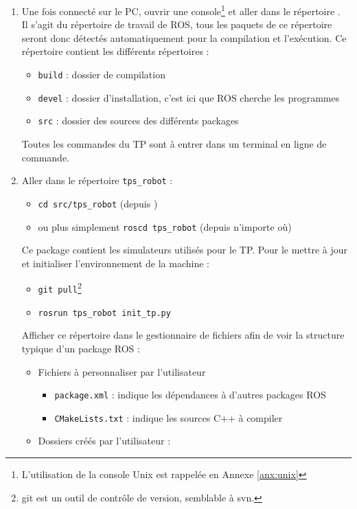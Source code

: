 \documentclass[12pt,a4paper]{article}
\begin{document}
\begin{enumerate}
 \item Une fois connecté sur le PC, ouvrir une console\footnote{ L'utilisation de la console Unix est rappelée en Annexe \ref{anx:unix}} et aller dans le répertoire \texttt{\ros}.\\
 Il s'agit du répertoire de travail de ROS, tous les paquets de ce répertoire seront donc détectés automatiquement pour la compilation et l'exécution.
 Ce répertoire contient les différents répertoires :
 \begin{itemize}
 \item \texttt{build} : dossier de compilation
 \item \texttt{devel} : dossier d'installation, c'est ici que ROS cherche les programmes
 \item \texttt{src} : dossier des sources des différents packages
 \end{itemize}
Toutes les commandes du TP sont à entrer dans un terminal en ligne de commande.
 \item Aller dans le répertoire \texttt{tps\_robot} : 
 \begin{itemize}
  \item \texttt{cd src/tps\_robot} (depuis \texttt{\ros})
  \item ou plus simplement \texttt{roscd tps\_robot} (depuis n'importe où)
 \end{itemize}
 Ce package contient les simulateurs utilisés pour le TP. Pour le mettre à jour et initialiser l'environnement de la machine :
 \begin{itemize}
 \item \texttt{git pull}\footnote{git est un outil de contrôle de version, semblable à svn.}
 \item \texttt{rosrun tps\_robot init\_tp.py}
 \end{itemize}
 Afficher ce répertoire dans le gestionnaire de fichiers afin de voir la structure typique d'un package ROS :
 \begin{itemize}
 \item Fichiers à personnaliser par l'utilisateur
 \begin{itemize}
 \item \texttt{package.xml} : indique les dépendances à d'autres packages ROS
 \item \texttt{CMakeLists.txt} : indique les sources C++ à compiler
 \end{itemize} 
 \item Dossiers créés par l'utilisateur :

\end{itemize}
\end{enumerate}
\end{document}
